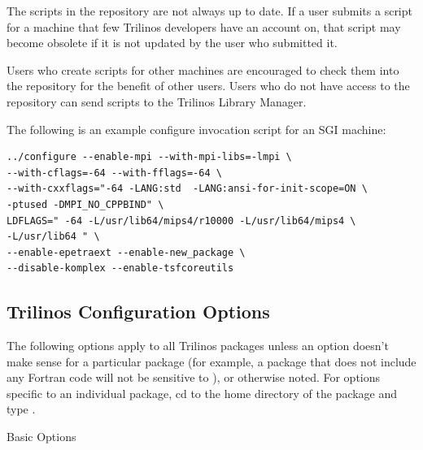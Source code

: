 \begin{enumerate}
The scripts in the 
repository are not always up to date.  If a user submits a script for a 
machine that few Trilinos developers have an account on, that script may 
become obsolete if it is not updated by the user who submitted it.

Users who create scripts for other machines are encouraged to check them into 
the repository for the benefit of other users.  Users who do not have access to
the repository can send scripts to the Trilinos Library Manager.

The following is an example configure invocation script for an SGI machine:

\begin{verbatim}
../configure --enable-mpi --with-mpi-libs=-lmpi \
--with-cflags=-64 --with-fflags=-64 \
--with-cxxflags="-64 -LANG:std  -LANG:ansi-for-init-scope=ON \
-ptused -DMPI_NO_CPPBIND" \
LDFLAGS=" -64 -L/usr/lib64/mips4/r10000 -L/usr/lib64/mips4 \
-L/usr/lib64 " \
--enable-epetraext --enable-new_package \
--disable-komplex --enable-tsfcoreutils
\end{verbatim}
\end{enumerate}

\subsection{Trilinos Configuration Options}
\label{subsect:TrilinosConfigOptions}
The following options apply to all Trilinos packages unless 
an option doesn't make sense for a particular package (for example, a 
package that does not include any Fortran code will not be sensitive to 
), or otherwise noted.  For options specific to 
an individual package, cd to the home directory of the 
package and type .

Basic Options

